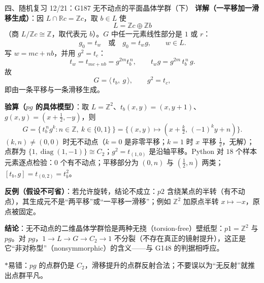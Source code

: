 \documentclass[aspectratio=169,10pt,fontset=none]{ctexbeamer}
\newcommand{\key}[1]{\textcolor{ink}{\bfseries #1}}
\newcommand{\starpt}{\textcolor{accent}{\bfseries$\ast$}}
\begin{document}
\begin{frame}[t]{四、随机复习 12/21：G187 无不动点的平面晶体学群（下）}
\scriptsize
\key{详解（一平移加一滑移生成）}：因 $L\cap\mathbb R c=\mathbb Z c$，取 $b\in L$ 使
\[ L=\mathbb Z c\oplus\mathbb Z b \]
（商 $L/\mathbb Z c\cong\mathbb Z$，取代表元 $b$）。$G$ 中任一元素线性部分是 $1$ 或 $r$：
\[ g_0=t_w\quad\text{或}\quad g_0=t_wg,\qquad w\in L . \]
写 $w=mc+nb$，并用 $g^2=t_c$：
\[ t_w= t_{mc+nb}=g^{2m}t_b^{\,n},\qquad t_wg=g^{2m}\,t_b^{\,n}\,g . \]
故
\[ G=\langle\, t_b,\ g\,\rangle,\qquad g^2=t_c, \]
即由一条平移与一条滑移生成。

\key{验算（$pg$ 的具体模型）}：取 $L=\mathbb Z^2$、$t_b(x,y)=(x,y+1)$、$g(x,y)=(x+\tfrac12,-y)$，则
\[ G=\{\,t_b^{\,n}g^{k}:n\in\mathbb Z,\ k\in\{0,1\}\,\}=\{(x,y)\mapsto(x+\tfrac{k}{2},\,(-1)^ky+n)\} . \]
$(k,n)\ne(0,0)$ 时无不动点（$k=0$ 是非零平移；$k=1$ 时 $x$ 平移 $\tfrac12$，无解）；点群为 $\{1,\operatorname{diag}(1,-1)\}\cong C_2$；$g^2=t_{(1,0)}$ 是沿轴平移。Python 对 $18$ 个样本元素逐点检验：$0$ 个有不动点；平移部分为 $(0,n)$ 与 $(\tfrac12,n)$ 两类；$[t_b,g]=t_{(0,2)}=t_b^2$。

\key{反例（假设不可省）}：若允许旋转，结论不成立：$p2$ 含绕某点的半转（有不动点），其生成元不是“两平移”或“一平移一滑移”；例如 $\mathbb Z^2$ 加原点半转 $x\mapsto -x$，原点被固定。

\key{结论}：无不动点的二维晶体学群恰是两种无挠（torsion-free）壁纸型：$p1=\mathbb Z^2$ 与 $pg$。对 $pg$，$1\to L\to G\to C_2\to1$ 不分裂（不存在真正的镜射提升），这正是它“非对称型”（nonsymmorphic）的含义——与 G148 的判据相呼应。

\starpt 易错：$pg$ 的点群仍是 $C_2$，滑移提升的点群反射合法；不要误以为“无反射”就推出点群平凡。
\end{frame}
\end{document}
